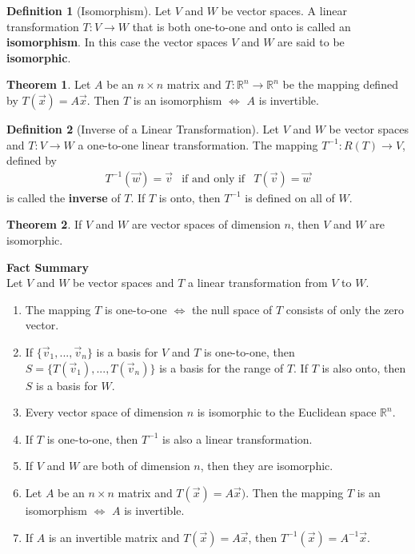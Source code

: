 \documentclass{article}
\renewcommand{\bf}[1]{\textbf{#1}}
\theoremstyle{definition}
\newtheorem{theorem}{Theorem}
\newtheorem{definition}{Definition}
\newenvironment{factsummary}{
	{\large\textbf{Fact Summary}}\\
}{
}
\newcommand{\reals}{\mathbb{R}}
\begin{document}
\begin{definition}[Isomorphism]
	Let $V$ and $W$ be vector spaces. A linear transformation $T: V \rightarrow W$ that is both one-to-one and onto is called an \bf{isomorphism}. In this case the vector spaces $V$ and $W$ are said to be \bf{isomorphic}.
\end{definition}

\begin{theorem}
	Let $A$ be an $n \times n$ matrix and $T : \reals^n \rightarrow \reals^n$ be the mapping defined by $T(\vec{x}) = A\vec{x}$. Then $T$ is an isomorphism $\iff$ $A$ is invertible.
\end{theorem}

\begin{definition}[Inverse of a Linear Transformation]
	Let $V$ and $W$ be vector spaces and $T:V \rightarrow W$ a one-to-one linear transformation. The mapping $T^{-1}:R(T) \rightarrow V$, defined by
	\[
	\begin{array}{ccc}
		T^{-1}(\vec{w}) = \vec{v} & \text{if and only if} & T(\vec{v}) = \vec{w}
	\end{array}
	\]
	is called the \textbf{inverse} of $T$. If $T$ is onto, then $T^{-1}$ is defined on all of $W$.
\end{definition}

\begin{theorem}
	If $V$ and $W$ are vector spaces of dimension $n$, then $V$ and $W$ are isomorphic.
\end{theorem}

\begin{factsummary}
	Let $V$ and $W$ be vector spaces and $T$ a linear transformation from $V$ to $W$.
	\begin{enumerate}[font=\bfseries,itemsep=0pt]
		\item The mapping $T$ is one-to-one $\iff$ the null space of $T$ consists of only the zero vector.
		\item If $\{ \vec{v}_1,...,\vec{v}_n\}$ is a basis for $V$ and $T$ is one-to-one, then \\$S = \{ T(\vec{v}_1),...,T(\vec{v}_n) \}$ is a basis for the range of $T$. If $T$ is also onto, then $S$ is a basis for $W$.
		\item Every vector space of dimension $n$ is isomorphic to the Euclidean space $\reals^n$.
		\item If $T$ is one-to-one, then $T^{-1}$ is also a linear transformation.
		\item If $V$ and $W$ are both of dimension $n$, then they are isomorphic.
		\item Let $A$ be an $n \times n$ matrix and $T(\vec{x}) = A\vec{x})$. Then the mapping $T$ is an isomorphism $\iff$ $A$ is invertible.
		\item If $A$ is an invertible matrix and $T(\vec{x}) = A\vec{x}$, then $T^{-1}(\vec{x}) = A^{-1}\vec{x}$.
	\end{enumerate}
\end{factsummary}
\end{document}
